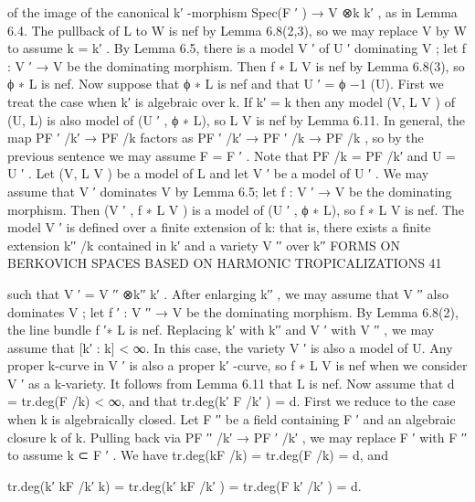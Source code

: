 \documentclass[
  10pt,
]{article}
\newenvironment{Shaded}{}{}
\newcommand{\NormalTok}[1]{#1}
\begin{document}
\begin{Shaded}
\begin{Highlighting}[]
\NormalTok{of the image of the canonical k′ {-}morphism Spec(F ′ ) → V ⊗k k′ , as in Lemma 6.4. The}
\NormalTok{pullback of L to W is nef by Lemma 6.8(2,3), so we may replace V by W to assume}
\NormalTok{k = k′ . By Lemma 6.5, there is a model V ′ of U ′ dominating V ; let f : V ′ → V be the}
\NormalTok{dominating morphism. Then f ∗ L V is nef by Lemma 6.8(3), so ϕ ∗ L is nef.}
\NormalTok{   Now suppose that ϕ ∗ L is nef and that U ′ = ϕ −1 (U). First we treat the case when k′ is}
\NormalTok{algebraic over k. If k′ = k then any model (V, L V ) of (U, L) is also model of (U ′ , ϕ ∗ L), so}
\NormalTok{L V is nef by Lemma 6.11. In general, the map PF ′ /k′ → PF /k factors as PF ′ /k′ → PF ′ /k →}
\NormalTok{PF /k , so by the previous sentence we may assume F = F ′ . Note that PF /k = PF /k′ and}
\NormalTok{U = U ′ . Let (V, L V ) be a model of L and let V ′ be a model of U ′ . We may assume that V ′}
\NormalTok{dominates V by Lemma 6.5; let f : V ′ → V be the dominating morphism. Then (V ′ , f ∗ L V )}
\NormalTok{is a model of (U ′ , ϕ ∗ L), so f ∗ L V is nef. The model V ′ is defined over a finite extension of}
\NormalTok{k: that is, there exists a finite extension k′′ /k contained in k′ and a variety V ′′ over k′′}
\NormalTok{                FORMS ON BERKOVICH SPACES BASED ON HARMONIC TROPICALIZATIONS                           41}

\NormalTok{such that V ′ = V ′′ ⊗k′′ k′ . After enlarging k′′ , we may assume that V ′′ also dominates V ;}
\NormalTok{let f ′ : V ′′ → V be the dominating morphism. By Lemma 6.8(2), the line bundle f ′∗ L is}
\NormalTok{nef. Replacing k′ with k′′ and V ′ with V ′′ , we may assume that [k′ : k] \textless{} ∞. In this case,}
\NormalTok{the variety V ′ is also a model of U. Any proper k{-}curve in V ′ is also a proper k′ {-}curve, so}
\NormalTok{f ∗ L V is nef when we consider V ′ as a k{-}variety. It follows from Lemma 6.11 that L is nef.}
\NormalTok{   Now assume that d = tr.deg(F /k) \textless{} ∞, and that tr.deg(k′ F /k′ ) = d. First we reduce}
\NormalTok{to the case when k is algebraically closed. Let F ′′ be a field containing F ′ and an algebraic}
\NormalTok{closure k of k. Pulling back via PF ′′ /k′ → PF ′ /k′ , we may replace F ′ with F ′′ to assume}
\NormalTok{k ⊂ F ′ . We have tr.deg(kF /k) = tr.deg(F /k) = d, and}

\NormalTok{                  tr.deg(k′ kF /k′ k) = tr.deg(k′ kF /k′ ) = tr.deg(F k′ /k′ ) = d.}


\end{Highlighting}
\end{Shaded}
\end{document}
